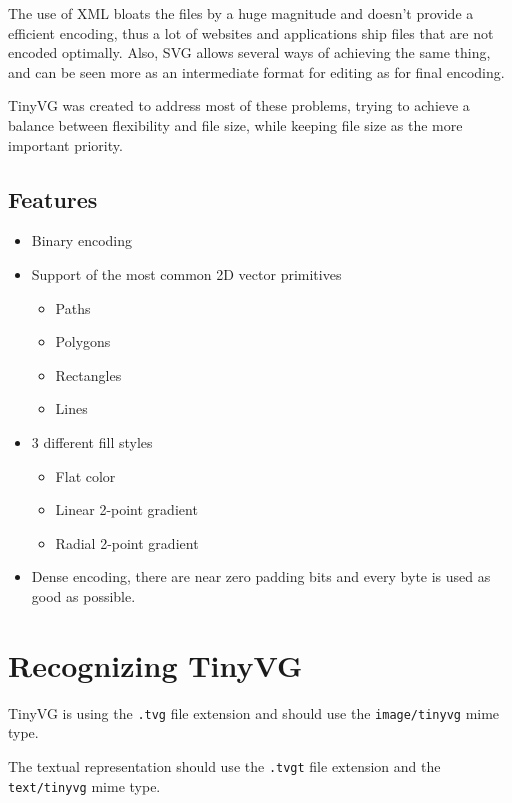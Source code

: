 \documentclass[]{article}
\providecommand{\tightlist}{%
  \setlength{\itemsep}{0pt}\setlength{\parskip}{0pt}}
\begin{document}
The use of XML bloats the files by a huge magnitude and doesn't provide
a efficient encoding, thus a lot of websites and applications ship files
that are not encoded optimally. Also, SVG allows several ways of
achieving the same thing, and can be seen more as an intermediate format
for editing as for final encoding.

TinyVG was created to address most of these problems, trying to achieve a
balance between flexibility and file size, while keeping file size as
the more important priority.

\hypertarget{features}{\subsection{Features}\label{features}}

\begin{itemize}
\tightlist
\item Binary encoding
\item
  Support of the most common 2D vector primitives
  \begin{itemize}
  \tightlist
  \item Paths
  \item Polygons
  \item Rectangles
  \item Lines
  \end{itemize}
\item
  3 different fill styles
  \begin{itemize}
  \tightlist
  \item Flat color
  \item Linear 2-point gradient
  \item Radial 2-point gradient
  \end{itemize}
\item Dense encoding, there are near zero padding bits and every byte is used as good as possible.
\end{itemize}

\hypertarget{recognition}{\section{Recognizing TinyVG}\label{recognition}}

TinyVG is using the \texttt{.tvg} file extension and should use the \texttt{image/tinyvg} mime type.

The textual representation should use the \texttt{.tvgt} file extension and the \texttt{text/tinyvg} mime type.
\end{document}
